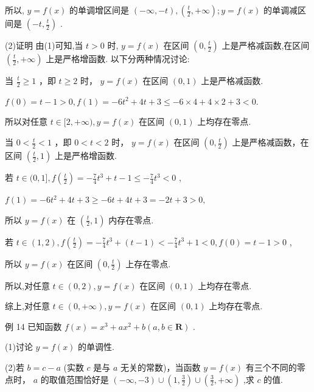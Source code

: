 \documentclass[10pt]{article}
\newcommand*\circled[1]{\tikz[baseline=(char.base)]{\node[shape=circle,draw,inner sep=1.5pt] (char) {\small #1};}}
\begin{document}
所以, \(y = f\left( x\right)\) 的单调增区间是 \(\left( {-\infty , - t}\right) ,\left( {\frac{t}{2}, + \infty }\right) ;y = f\left( x\right)\) 的单调减区间是 \(\left( {-t,\frac{t}{2}}\right)\) .

(2)证明 由(1)可知,当 \(t > 0\) 时, \(y = f\left( x\right)\) 在区间 \(\left( {0,\frac{t}{2}}\right)\) 上是严格减函数,在区间 \(\left( {\frac{t}{2}, + \infty }\right)\) 上是严格增函数. 以下分两种情况讨论:

 \circled{1} 当 \(\frac{t}{2} \geq  1\) ，即 \(t \geq  2\) 时， \(y = f\left( x\right)\) 在区间 \(\left( {0,1}\right)\) 上是严格减函数.

\(f\left( 0\right)  = t - 1 > 0,f\left( 1\right)  =  - 6{t}^{2} + {4t} + 3 \leq   - 6 \times  4 + 4 \times  2 + 3 < 0.\)

所以对任意 \(t \in  \lbrack 2, + \infty ),y = f\left( x\right)\) 在区间 \(\left( {0,1}\right)\) 上均存在零点.

 \circled{2} 当 \(0 < \frac{t}{2} < 1\) ，即 \(0 < t < 2\) 时， \(y = f\left( x\right)\) 在区间 \(\left( {0,\frac{t}{2}}\right)\) 上是严格减函数，在区间 \(\left( {\frac{t}{2},1}\right)\) 上是严格增函数.

若 \(t \in  (0,1\rbrack ,f\left( \frac{t}{2}\right)  =  - \frac{7}{4}{t}^{3} + t - 1 \leq   - \frac{7}{4}{t}^{3} < 0\) ,

\(f\left( 1\right)  =  - 6{t}^{2} + {4t} + 3 \geq   - {6t} + {4t} + 3 =  - {2t} + 3 > 0,\)

所以 \(y = f\left( x\right)\) 在 \(\left( {\frac{t}{2},1}\right)\) 内存在零点.

若 \(t \in  \left( {1,2}\right) ,f\left( \frac{t}{2}\right)  =  - \frac{7}{4}{t}^{3} + \left( {t - 1}\right)  <  - \frac{7}{4}{t}^{3} + 1 < 0,f\left( 0\right)  = t - 1 > 0\) ,

所以 \(y = f\left( x\right)\) 在区间 \(\left( {0,\frac{t}{2}}\right)\) 上存在零点.

所以,对任意 \(t \in  \left( {0,2}\right) ,y = f\left( x\right)\) 在区间 \(\left( {0,1}\right)\) 上均存在零点.

综上,对任意 \(t \in  \left( {0, + \infty }\right) ,y = f\left( x\right)\) 在区间 \(\left( {0,1}\right)\) 上均存在零点.

例 14 已知函数 \(f\left( x\right)  = {x}^{3} + a{x}^{2} + b\left( {a,b \in  \mathbf{R}}\right)\) .

(1)讨论 \(y = f\left( x\right)\) 的单调性.

(2)若 \(b = c - a\) (实数 \(c\) 是与 \(a\) 无关的常数)，当函数 \(y = f\left( x\right)\) 有三个不同的零点时， \(a\) 的取值范围恰好是 \(\left( {-\infty , - 3}\right)  \cup  \left( {1,\frac{3}{2}}\right)  \cup  \left( {\frac{3}{2}, + \infty }\right)\) ,求 \(c\) 的值.
\end{document}
